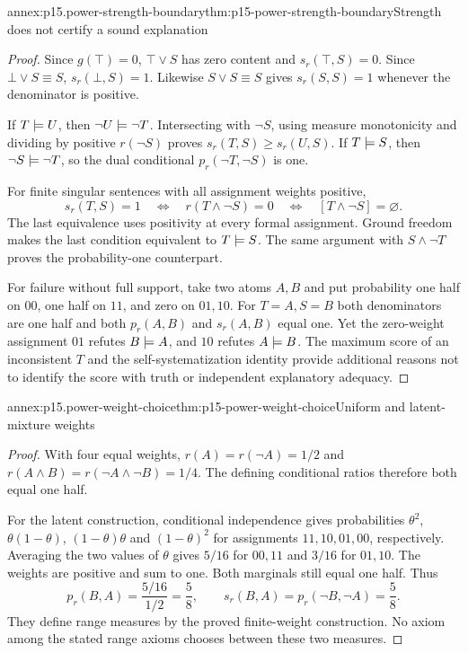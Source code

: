 \begin{annexitem}{annex:p15.power-strength-boundary}{thm:p15-power-strength-boundary}{Strength does not certify a sound explanation}
\begin{proof}
Since \(g(\top)=0\),
\(\top\lor S\) has
zero content and
\(s_r(\top,S)=0\).
Since \(\bot\lor S\equiv S\),
\(s_r(\bot,S)=1\).
Likewise \(S\lor S\equiv S\)
gives \(s_r(S,S)=1\)
whenever the denominator
is positive.

If \(T\models U\),
then \(\neg U\models\neg T\).
Intersecting with \(\neg S\),
using measure monotonicity
and dividing by positive
\(r(\neg S)\) proves
\(s_r(T,S)\ge s_r(U,S)\).
If \(T\models S\),
then \(\neg S\models\neg T\),
so the dual conditional
\(p_r(\neg T,\neg S)\)
is one.

For finite singular
sentences with all
assignment weights
positive,
\[
 s_r(T,S)=1
 \quad\Longleftrightarrow\quad
 r(T\land\neg S)=0
 \quad\Longleftrightarrow\quad
 [T\land\neg S]=\varnothing.
\]
The last equivalence
uses positivity at
every formal assignment.
Ground freedom makes
the last condition
equivalent to \(T\models S\).
The same argument
with \(S\land\neg T\)
proves the probability-one
counterpart.

For failure without
full support, take
two atoms \(A,B\)
and put probability
one half on \(00\),
one half on \(11\),
and zero on \(01,10\).
For \(T=A,S=B\)
both denominators
are one half and
both \(p_r(A,B)\)
and \(s_r(A,B)\)
equal one.
Yet the zero-weight
assignment \(01\)
refutes \(B\models A\),
and \(10\) refutes
\(A\models B\).
The maximum score
of an inconsistent
\(T\) and the
self-systematization
identity provide
additional reasons
not to identify
the score with
truth or independent
explanatory adequacy.
\end{proof}
\end{annexitem}

\begin{annexitem}{annex:p15.power-weight-choice}{thm:p15-power-weight-choice}{Uniform and latent-mixture weights}
\begin{proof}
With four equal weights,
\(r(A)=r(\neg A)=1/2\)
and
\(r(A\land B)=r(\neg A\land\neg B)=1/4\).
The defining conditional
ratios therefore both
equal one half.

For the latent construction,
conditional independence
gives probabilities
\(\theta^2\),
\(\theta(1-\theta)\),
\((1-\theta)\theta\)
and \((1-\theta)^2\)
for assignments \(11,10,01,00\), respectively.
Averaging the two
values of \(\theta\)
gives \(5/16\)
for \(00,11\)
and \(3/16\)
for \(01,10\).
The weights are
positive and sum
to one. Both
marginals still
equal one half.
Thus
\[
 p_r(B,A)=\frac{5/16}{1/2}=\frac58,
 \qquad
 s_r(B,A)=p_r(\neg B,\neg A)=\frac58.
\]
They define range
measures by the
proved finite-weight
construction. No
axiom among the
stated range axioms
chooses between
these two measures.
\end{proof}
\end{annexitem}

